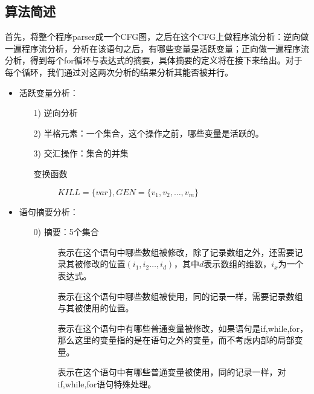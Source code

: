 \documentclass[12pt]{article}
\begin{document}
		\subsection{算法简述}
			首先，将整个程序parser成一个CFG图，之后在这个CFG上做程序流分析：逆向做一遍程序流分析，分析在该语句之后，有哪些变量是活跃变量；正向做一遍程序流分析，得到每个for循环与表达式的摘要，具体摘要的定义将在接下来给出。对于每个循环，我们通过对这两次分析的结果分析其能否被并行。\\
			\begin{itemize}
				\item 活跃变量分析：
				\begin{itemize}
					\item[1)] 逆向分析
					\item[2)] 半格元素：一个集合，这个操作之前，哪些变量是活跃的。
					\item[3)] 交汇操作：集合的并集
					\begin{item}[4)] 
						变换函数\\
						\begin{description}
							\item[]
								$KILL=\{var\},GEN=\{v_1,v_2,\dots, v_m\}$ 
						\end{description}
					\end{item}
				\end{itemize}
				\item 语句摘要分析：
				\begin{itemize} 
					\item[0)] 摘要：5个集合\\
						\begin{description}
							\item[]
								表示在这个语句中哪些数组被修改，除了记录数组之外，还需要记录其被修改的位置$(i_1,i_2\dots ,i_d)$，其中$d$表示数组的维数，$i_x$为一个表达式。
							\item[]
								表示在这个语句中哪些数组被使用，同的记录一样，需要记录数组与其被使用的位置。
							\item[]
								表示在这个语句中有哪些普通变量被修改，如果语句是if,while,for，那么这里的变量指的是在语句之外的变量，而不考虑内部的局部变量。
							\item[]
								表示在这个语句中有哪些普通变量被使用，同的记录一样，对if,while,for语句特殊处理。
							\item[]

\end{description}
\end{itemize}
\end{itemize}
\end{document}
